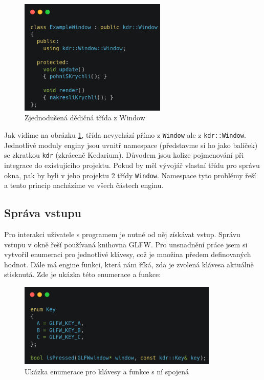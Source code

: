 \documentclass[12pt]{article}
\begin{document}
\vspace{0.5cm}
\begin{figure}[h]
    \centering
    \includegraphics[height=5.5cm]{images/window_child_code.png}
    \caption{Zjednodušená dědičná třída z Window}
    \label{fig:Zjednodušená dědičná třída z Window}
\end{figure}

\pagebreak

Jak vidíme na obrázku \ref{fig:Zjednodušená dědičná třída z Window}, třída nevychází přímo z \texttt{Window} ale z \texttt{kdr::Window}. Jednotlivé moduly enginy jsou uvnitř namespace (představme si ho jako balíček) se zkratkou \texttt{kdr} (zkráceně Kedarium). Důvodem jsou kolize pojmenování při integrace do existujícího projektu. Pokud by měl vývojář vlastní třídu pro správu okna, pak by byli v jeho projektu 2 třídy \texttt{Window}. Namespace tyto problémy řeší a tento princip nacházíme ve všech částech enginu.

\subsection{Správa vstupu}

Pro interakci uživatele s programem je nutné od něj získávat vstup. Správu vstupu v okně řeší používaná knihovna GLFW. Pro unsnadnění práce jsem si vytvořil enumeraci pro jednotlivé klávesy, což je množina předem definovaných hodnot. \cite{enum} Dále má engine funkci, která nám říká, zda je zvolená klávesa aktuálně stisknutá. Zde je ukázka této enumerace a funkce:

\vspace{0.5cm}
\begin{figure}[h]
    \centering
    \includegraphics[height=4cm]{images/keys.png}
    \caption{Ukázka enumerace pro klávesy a funkce s ní spojená}
    \label{fig:Ukázka enumerace pro klávesy a funkce s ní spojená}
\end{figure}
\end{document}
